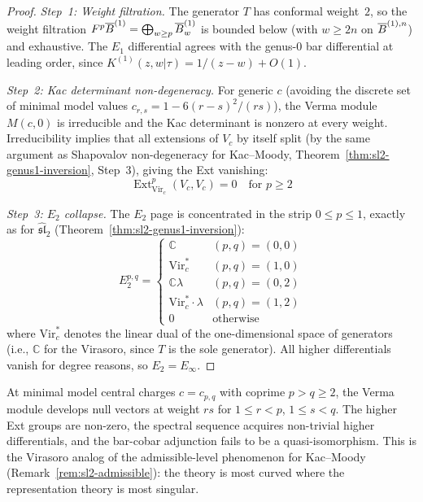 \begin{proof}
\emph{Step~1: Weight filtration.}
The generator $T$ has conformal weight~$2$, so the weight filtration
$F^p\overline{B}^{(1)} = \bigoplus_{w \geq p} \overline{B}^{(1)}_w$ is bounded below
(with $w \geq 2n$ on $\overline{B}^{(1),n}$) and exhaustive.  The $E_1$
differential agrees with the genus-0 bar differential at leading
order, since
$K^{(1)}(z,w|\tau) = 1/(z-w) + O(1)$.

\emph{Step~2: Kac determinant non-degeneracy.}
For generic $c$ (avoiding the discrete set of minimal model values
$c_{r,s} = 1 - 6(r-s)^2/(rs)$), the Verma module $M(c,0)$ is
irreducible and the Kac determinant is nonzero at every weight.
Irreducibility implies that all extensions of $V_c$ by itself split
(by the same argument as Shapovalov non-degeneracy for Kac--Moody,
Theorem~\ref{thm:sl2-genus1-inversion}, Step~3), giving the
Ext vanishing:
\begin{equation}
\operatorname{Ext}^p_{\mathrm{Vir}_c}(V_c, V_c) = 0 \quad \text{for } p \geq 2
\end{equation}

\emph{Step~3: $E_2$ collapse.}
The $E_2$ page is concentrated in the strip $0 \leq p \leq 1$,
exactly as for $\widehat{\mathfrak{sl}}_2$
(Theorem~\ref{thm:sl2-genus1-inversion}):
\begin{equation}
E_2^{p,q} = \begin{cases}
\mathbb{C} & (p,q) = (0,0) \\
\mathrm{Vir}_c^* & (p,q) = (1,0) \\
\mathbb{C}\lambda & (p,q) = (0,2) \\
\mathrm{Vir}_c^* \cdot \lambda & (p,q) = (1,2) \\
0 & \text{otherwise}
\end{cases}
\end{equation}
where $\mathrm{Vir}_c^*$ denotes the linear dual of the
one-dimensional space of generators (i.e., $\mathbb{C}$ for the
Virasoro, since $T$ is the sole generator).  All higher differentials
vanish for degree reasons, so $E_2 = E_\infty$.
\end{proof}

\begin{remark}\label{rem:vir-minimal-model}
At minimal model central charges $c = c_{p,q}$ with coprime $p > q \geq 2$,
the Verma module develops null vectors at weight $rs$ for $1 \leq r < p$,
$1 \leq s < q$.  The higher Ext groups are non-zero, the spectral
sequence acquires non-trivial higher differentials, and the bar-cobar
adjunction fails to be a quasi-isomorphism.  This is the Virasoro
analog of the admissible-level phenomenon for Kac--Moody
(Remark~\ref{rem:sl2-admissible}): the theory is most curved where
the representation theory is most singular.
\end{remark}

